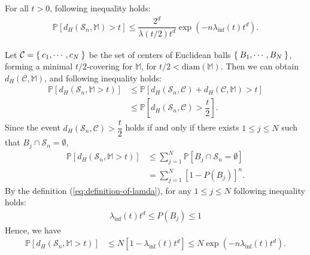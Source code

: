 \documentclass[dvipdfmx,11pt,notheorems]{article}
\begin{document}
\begin{lem}\label{lem:Fasy-lemma4}
  For all $t > 0$, following inequality holds:
  \begin{align*}
    \mathbb{P} \left[ d_H \left( \mathcal{S}_n, \mathbb{M} \right) > t \right] \leq \dfrac{ 2^d }{ \lambda \left( t / 2 \right) t^d } \exp \left( -n \lambda_{\inf} \left( t \right) t^d \right).
  \end{align*}
\end{lem}

Let $\mathcal{C} = \Set{ c_1, \cdots, c_N }$ be the set of centers of Euclidean balls $\Set{ B_1, \cdots, B_N }$, forming a minimal $t/2$-covering for $\mathbb{M}$, for $t / 2 < \mathrm{diam}\left( \mathbb{M} \right)$. Then we can obtain $d_H\left( \mathcal{C}, \mathbb{M} \right)$, and following inequality holds:
\begin{align*}
  \mathbb{P} \left[ d_H\left( \mathcal{S}_n, \mathbb{M} > t \right) \right]
   & \leq \mathbb{P} \left[ d_H\left( \mathcal{S}_n, \mathcal{C} \right) + d_H\left( \mathcal{C}, \mathbb{M} \right) > t \right] \\
   & \leq \mathbb{P} \left[ d_H\left( \mathcal{S}_n, \mathcal{C} \right) > \dfrac{t}{2} \right].
\end{align*}
Since the event $d_H\left( \mathcal{S}_n, \mathcal{C} \right) > \dfrac{t}{2}$ holds if and only if there exists $1\leq j\leq N$ such that $B_j\cap \mathcal{S}_n = \emptyset$,
\begin{align*}
  \mathbb{P} \left[ d_H\left( \mathcal{S}_n, \mathbb{M} > t \right) \right] & \leq \sum_{j = 1}^N \mathbb{P} \left[ B_j\cap \mathcal{S}_n = \emptyset \right] \\
                                                                            & = \sum_{j = 1}^N \left[ 1 - P\left( B_j \right) \right]^n.
\end{align*}
By the definition (\ref{eq:definition-of-lamda}), for any $1\leq j\leq N$ following inequality holds:
\begin{align*}
  \lambda_{\inf} \left( t \right) t^d \leq P\left( B_j \right) \leq 1
\end{align*}
Hence, we have
\begin{align*}
  \mathbb{P} \left[ d_H\left( \mathcal{S}_n, \mathbb{M} > t \right) \right] & \leq N \left[ 1 - \lambda_{\inf} \left( t \right) t^d \right] \leq N \exp \left( -n \lambda_{\inf} \left( t \right) t^d \right).
\end{align*}

\cleardoublepage
{}
{}
\end{document}
